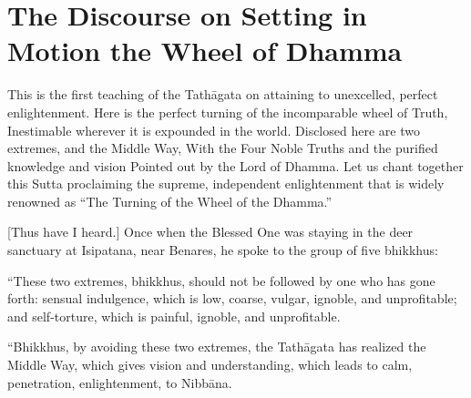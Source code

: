 
\chapter[The Wheel of Dhamma]{The Discourse on Setting in Motion the Wheel of Dhamma}

\begin{leader}

This is the first teaching of the Tathāgata on attaining to unexcelled, perfect enlightenment.
Here is the perfect turning of the incomparable wheel of Truth,
Inestimable wherever it is expounded in the world.
Disclosed here are two extremes, and the Middle Way,
With the Four Noble Truths and the purified knowledge and vision
Pointed out by the Lord of Dhamma.
Let us chant together this Sutta proclaiming the supreme, independent enlightenment that is widely renowned as
``The Turning of the Wheel of the Dhamma.''
\end{leader}

[Thus have I heard.] Once when the Blessed One was staying in the deer sanctuary at Isipatana, near Benares, he spoke to the group of five bhikkhus:

``These two extremes, bhikkhus, should not be followed by one who has gone forth: sensual indulgence, which is low, coarse, vulgar, ignoble, and unprofitable; and self-torture, which is painful, ignoble, and unprofitable.

``Bhikkhus, by avoiding these two extremes, the Tathāgata has realized the Middle Way, which gives vision and understanding, which leads to calm, penetration, enlightenment, to Nibbāna.



